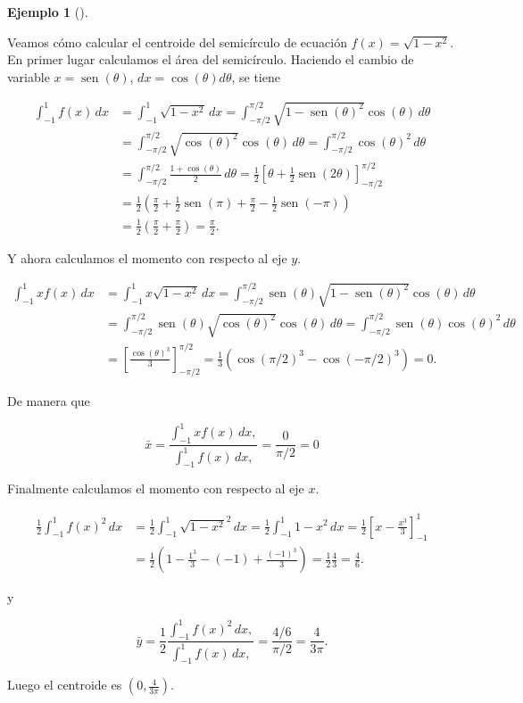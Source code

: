 \documentclass[
  a4paper,
]{scrreport}
\theoremstyle{definition}
\newtheorem{example}{Ejemplo}[chapter]
\theoremstyle{plain}
\theoremstyle{definition}
\theoremstyle{definition}
\theoremstyle{plain}
\theoremstyle{plain}
\theoremstyle{remark}
\begin{document}
\begin{example}[]\protect\hypertarget{exm-centroide}{}\label{exm-centroide}

Veamos cómo calcular el centroide del semicírculo de ecuación
\(f(x)=\sqrt{1-x^2}\). En primer lugar calculamos el área del
semicírculo. Haciendo el cambio de variable
\(x=\operatorname{sen}(\theta)\), \(dx = \cos(\theta)d\theta\), se tiene

\begin{align*}
\int_{-1}^1 f(x)\,dx 
&= \int_{-1}^1 \sqrt{1-x^2}\,dx 
= \int_{-\pi/2}^{\pi/2} \sqrt{1-\operatorname{sen}(\theta)^2}\cos(\theta)\,d\theta \\
&= \int_{-\pi/2}^{\pi/2} \sqrt{\cos(\theta)^2}\cos(\theta)\,d\theta
= \int_{-\pi/2}^{\pi/2} \cos(\theta)^2\,d\theta \\
&= \int_{-\pi/2}^{\pi/2} \frac{1+\cos(\theta)}{2}\,d\theta
= \frac{1}{2}\left[\theta + \frac{1}{2}\operatorname{sen}(2\theta) \right]_{-\pi/2}^{\pi/2} \\
&= \frac{1}{2}\left(\frac{\pi}{2}+\frac{1}{2}\operatorname{sen}(\pi)+\frac{\pi}{2}-\frac{1}{2}\operatorname{sen}(-\pi)\right)\\
&= \frac{1}{2}\left(\frac{\pi}{2}+\frac{\pi}{2}\right)
= \frac{\pi}{2}.
\end{align*}

Y ahora calculamos el momento con respecto al eje \(y\).

\begin{align*}
\int_{-1}^1 xf(x)\,dx 
&= \int_{-1}^1 x\sqrt{1-x^2}\,dx 
= \int_{-\pi/2}^{\pi/2} \operatorname{sen}(\theta)\sqrt{1-\operatorname{sen}(\theta)^2}\cos(\theta)\,d\theta \\
&= \int_{-\pi/2}^{\pi/2} \operatorname{sen}(\theta)\sqrt{\cos(\theta)^2}\cos(\theta)\,d\theta
= \int_{-\pi/2}^{\pi/2} \operatorname{sen}(\theta)\cos(\theta)^2\,d\theta \\
&= \left[\frac{\cos(\theta)^3}{3} \right]_{-\pi/2}^{\pi/2} 
= \frac{1}{3}(\cos(\pi/2)^3-\cos(-\pi/2)^3)
= 0.
\end{align*}

De manera que

\[
\bar x = \frac{\int_{-1}^1 x f(x)\, dx,}{\int_{-1}^1 f(x)\, dx,} = \frac{0}{\pi/2} = 0
\]

Finalmente calculamos el momento con respecto al eje \(x\).

\begin{align*}
\frac{1}{2}\int_{-1}^1 f(x)^2\,dx 
&= \frac{1}{2}\int_{-1}^1 \sqrt{1-x^2}^2\,dx 
= \frac{1}{2}\int_{-1}^1 1-x^2\,dx
= \frac{1}{2}\left[x - \frac{x^3}{3}\right]_{-1}^1 \\
&= \frac{1}{2}\left(1-\frac{1^3}{3}-(-1)+\frac{(-1)^3}{3}\right)
= \frac{1}{2}\frac{4}{3}
= \frac{4}{6}. 
\end{align*}

y

\[
\bar y = \frac{1}{2}\frac{\int_{-1}^1 f(x)^2\, dx,}{\int_{-1}^1 f(x)\, dx,} = \frac{4/6}{\pi/2} = \frac{4}{3\pi}.
\]

Luego el centroide es \(\left(0, \frac{4}{3\pi}\right)\).

\end{example}
\end{document}

